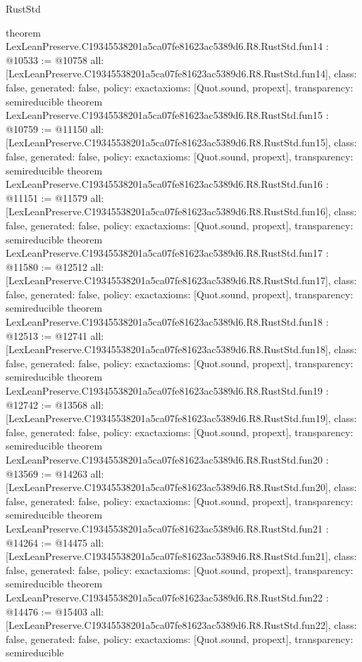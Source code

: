 \begin{lexlean}{RustStd}
\begin{coremodule}
{}
theorem LexLeanPreserve.C19345538201a5ca07fe81623ac5389d6.R8.RustStd.fun14 : @10533 := @10758 {
  all: [LexLeanPreserve.C19345538201a5ca07fe81623ac5389d6.R8.RustStd.fun14],
  class: false,
  generated: false,
  policy: exact{axioms: [Quot.sound, propext]},
  transparency: semireducible
}
theorem LexLeanPreserve.C19345538201a5ca07fe81623ac5389d6.R8.RustStd.fun15 : @10759 := @11150 {
  all: [LexLeanPreserve.C19345538201a5ca07fe81623ac5389d6.R8.RustStd.fun15],
  class: false,
  generated: false,
  policy: exact{axioms: [Quot.sound, propext]},
  transparency: semireducible
}
theorem LexLeanPreserve.C19345538201a5ca07fe81623ac5389d6.R8.RustStd.fun16 : @11151 := @11579 {
  all: [LexLeanPreserve.C19345538201a5ca07fe81623ac5389d6.R8.RustStd.fun16],
  class: false,
  generated: false,
  policy: exact{axioms: [Quot.sound, propext]},
  transparency: semireducible
}
theorem LexLeanPreserve.C19345538201a5ca07fe81623ac5389d6.R8.RustStd.fun17 : @11580 := @12512 {
  all: [LexLeanPreserve.C19345538201a5ca07fe81623ac5389d6.R8.RustStd.fun17],
  class: false,
  generated: false,
  policy: exact{axioms: [Quot.sound, propext]},
  transparency: semireducible
}
theorem LexLeanPreserve.C19345538201a5ca07fe81623ac5389d6.R8.RustStd.fun18 : @12513 := @12741 {
  all: [LexLeanPreserve.C19345538201a5ca07fe81623ac5389d6.R8.RustStd.fun18],
  class: false,
  generated: false,
  policy: exact{axioms: [Quot.sound, propext]},
  transparency: semireducible
}
theorem LexLeanPreserve.C19345538201a5ca07fe81623ac5389d6.R8.RustStd.fun19 : @12742 := @13568 {
  all: [LexLeanPreserve.C19345538201a5ca07fe81623ac5389d6.R8.RustStd.fun19],
  class: false,
  generated: false,
  policy: exact{axioms: [Quot.sound, propext]},
  transparency: semireducible
}
theorem LexLeanPreserve.C19345538201a5ca07fe81623ac5389d6.R8.RustStd.fun20 : @13569 := @14263 {
  all: [LexLeanPreserve.C19345538201a5ca07fe81623ac5389d6.R8.RustStd.fun20],
  class: false,
  generated: false,
  policy: exact{axioms: [Quot.sound, propext]},
  transparency: semireducible
}
theorem LexLeanPreserve.C19345538201a5ca07fe81623ac5389d6.R8.RustStd.fun21 : @14264 := @14475 {
  all: [LexLeanPreserve.C19345538201a5ca07fe81623ac5389d6.R8.RustStd.fun21],
  class: false,
  generated: false,
  policy: exact{axioms: [Quot.sound, propext]},
  transparency: semireducible
}
theorem LexLeanPreserve.C19345538201a5ca07fe81623ac5389d6.R8.RustStd.fun22 : @14476 := @15403 {
  all: [LexLeanPreserve.C19345538201a5ca07fe81623ac5389d6.R8.RustStd.fun22],
  class: false,
  generated: false,
  policy: exact{axioms: [Quot.sound, propext]},
  transparency: semireducible
}
\end{coremodule}
\end{lexlean}
